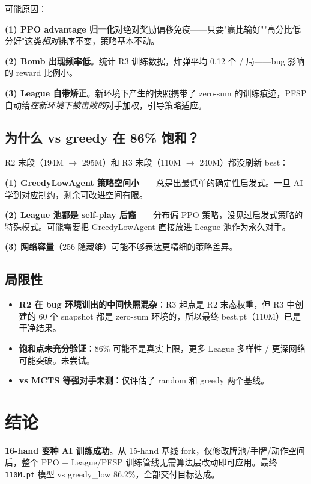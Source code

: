 \documentclass[twocolumn,a4paper,10pt]{ctexart}
\begin{document}
可能原因：

\textbf{(1) PPO advantage 归一化}对绝对奖励偏移免疫——只要"赢比输好""高分比低分好"这类\emph{相对}排序不变，策略基本不动。

\textbf{(2) Bomb 出现频率低}。统计 R3 训练数据，炸弹平均 0.12 个 / 局——bug 影响的 reward 比例小。

\textbf{(3) League 自带矫正}。新环境下产生的快照携带了 zero-sum 的训练痕迹，PFSP 自动给\emph{在新环境下被击败的}对手加权，引导策略适应。

\subsection{为什么 vs greedy 在 86\% 饱和？}

R2 末段（194M $\to$ 295M）和 R3 末段（110M $\to$ 240M）都没刷新 best：

\textbf{(1) GreedyLowAgent 策略空间小}——总是出最低单的确定性启发式。一旦 AI 学到对应制约，剩余可改进空间有限。

\textbf{(2) League 池都是 self-play 后裔}——分布偏 PPO 策略，没见过启发式策略的特殊模式。可能需要把 GreedyLowAgent 直接放进 League 池作为永久对手。

\textbf{(3) 网络容量}（256 隐藏维）可能不够表达更精细的策略差异。

\subsection{局限性}

\begin{itemize}[nosep,leftmargin=1.2em]
\item \textbf{R2 在 bug 环境训出的中间快照混杂}：R3 起点是 R2 末态权重，但 R3 中创建的 60 个 snapshot 都是 zero-sum 环境的，所以最终 best.pt（110M）已是干净结果。
\item \textbf{饱和点未充分验证}：86\% 可能不是真实上限，更多 League 多样性 / 更深网络可能突破。未尝试。
\item \textbf{vs MCTS 等强对手未测}：仅评估了 random 和 greedy 两个基线。
\end{itemize}

\section{结论}

\textbf{16-hand 变种 AI 训练成功}。从 15-hand 基线 fork，仅修改牌池/手牌/动作空间后，整个 PPO + League/PFSP 训练管线无需算法层改动即可应用。最终 \texttt{110M.pt} 模型 vs greedy\_low 86.2\%，全部交付目标达成。
\end{document}

